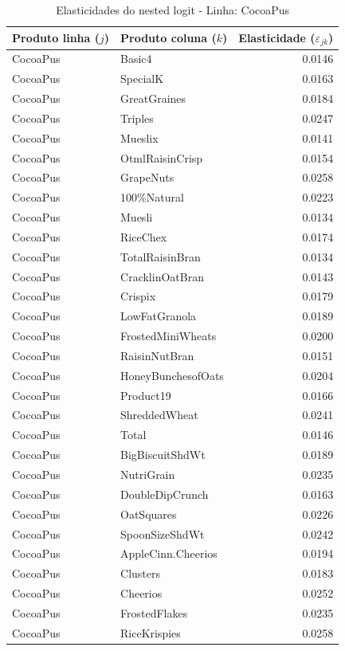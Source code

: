 \begingroup
\begin{table}[H]
\centering
\caption{Elasticidades do nested logit - Linha: CocoaPus}
\label{tab:elas-nested-cocoapus}
\small
\begin{tabular}{llr}
\toprule
Produto linha ($j$) & Produto coluna ($k$) & Elasticidade ($\varepsilon_{jk}$) \\
\midrule
CocoaPus & Basic4 & 0.0146 \\
CocoaPus & SpecialK & 0.0163 \\
CocoaPus & GreatGraines & 0.0184 \\
CocoaPus & Triples & 0.0247 \\
CocoaPus & Mueslix & 0.0141 \\
CocoaPus & OtmlRaisinCrisp & 0.0154 \\
CocoaPus & GrapeNuts & 0.0258 \\
CocoaPus & 100\%Natural & 0.0223 \\
CocoaPus & Muesli & 0.0134 \\
CocoaPus & RiceChex & 0.0174 \\
CocoaPus & TotalRaisinBran & 0.0134 \\
CocoaPus & CracklinOatBran & 0.0143 \\
CocoaPus & Crispix & 0.0179 \\
CocoaPus & LowFatGranola & 0.0189 \\
CocoaPus & FrostedMiniWheats & 0.0200 \\
CocoaPus & RaisinNutBran & 0.0151 \\
CocoaPus & HoneyBunchesofOats & 0.0204 \\
CocoaPus & Product19 & 0.0166 \\
CocoaPus & ShreddedWheat & 0.0241 \\
CocoaPus & Total & 0.0146 \\
CocoaPus & BigBiscuitShdWt & 0.0189 \\
CocoaPus & NutriGrain & 0.0235 \\
CocoaPus & DoubleDipCrunch & 0.0163 \\
CocoaPus & OatSquares & 0.0226 \\
CocoaPus & SpoonSizeShdWt & 0.0242 \\
CocoaPus & AppleCinn.Cheerios & 0.0194 \\
CocoaPus & Clusters & 0.0183 \\
CocoaPus & Cheerios & 0.0252 \\
CocoaPus & FrostedFlakes & 0.0235 \\
CocoaPus & RiceKrispies & 0.0258 \\

\end{tabular}
\end{table}
